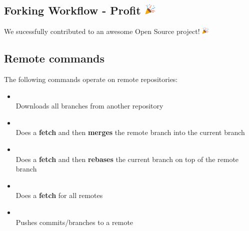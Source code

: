 \subsection{Forking Workflow - Profit \includegraphics[height=1em]{../assets/images/party-popper_1f389.png}}
\begin{frame}[fragile]
  \subslidetitle

  \vspace{8em}
  \begin{center}
      We sucessfully contributed to an awesome Open Source project! \includegraphics[height=1em]{../assets/images/party-popper_1f389.png}
  \end{center}

\end{frame}

\subsection{Remote commands}
\begin{frame}[fragile]
  \subslidetitle
  The following commands operate on remote repositories:
  \begin{itemize}
    \item {} \\
      Downloads all branches from another repository
    \item {} \\
      Does a {\bf fetch} and then {\bf merges} the remote branch into the current branch
    \item {} \\
      Does a {\bf fetch} and then {\bf rebases} the current branch on top of the remote branch
    \item {} \\
      Does a {\bf fetch} for all remotes
    \item {} \\
      Pushes commits/branches to a remote
  \end{itemize}
\end{frame}

